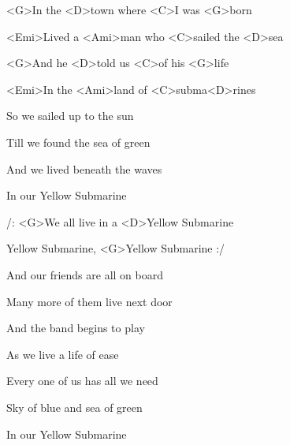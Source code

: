 

\zs
<G>In the <D>town where <C>I was <G>born

<Emi>Lived a <Ami>man who <C>sailed the <D>sea

<G>And he <D>told us <C>of his <G>life

<Emi>In the <Ami>land of <C>subma<D>rines
\ks

\zs
So we sailed up to the sun

Till we found the sea of green

And we lived beneath the waves

In our Yellow Submarine
\ks

\zr
/: <G>We all live in a <D>Yellow Submarine

Yellow Submarine, <G>Yellow Submarine :/
\kr

\zs
And our friends are all on board

Many more of them live next door

And the band begins to play
\ks

\zr \kr

\zs
As we live a life of ease

Every one of us has all we need

Sky of blue and sea of green

In our Yellow Submarine
\ks

\zr \kr \zr \kr

\kp
